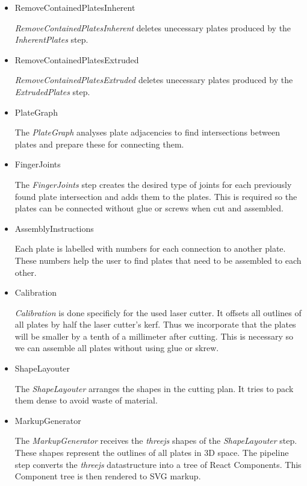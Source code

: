 \documentclass[../ClassicThesis.tex]{subfiles}
\begin{document}
\begin{itemize}
\item RemoveContainedPlatesInherent

\emph{RemoveContainedPlatesInherent} deletes unecessary plates produced by the \emph{InherentPlates} step.


\item RemoveContainedPlatesExtruded

\emph{RemoveContainedPlatesExtruded} deletes unecessary plates produced by the \emph{ExtrudedPlates} step.


\item PlateGraph

The \emph{PlateGraph} analyses plate adjacencies to find intersections between plates and prepare these for connecting them.

\item FingerJoints

The \emph{FingerJoints} step creates the desired type of joints for each previously found plate intersection and adds them to the plates. This is required so the plates can be connected without glue or screws when cut and assembled.


\item AssemblyInstructions

Each plate is labelled with numbers for each connection to another plate. These numbers help the user to find plates that need to be assembled to each other.


\item Calibration
\label{sec:calibration}

\emph{Calibration} is done specificly for the used laser cutter. It offsets all outlines of all plates by half the laser cutter’s kerf. Thus we incorporate that the plates will be smaller by a tenth of a millimeter after cutting. This is necessary so we can assemble all plates without using glue or skrew.


\item ShapeLayouter

The \emph{ShapeLayouter} arranges the shapes in the cutting plan. It tries to pack them dense to avoid waste of material.


\item MarkupGenerator

The \emph{MarkupGenerator} receives the \emph{threejs} shapes of the \emph{ShapeLayouter} step. These shapes represent the outlines of all plates in 3D space. The pipeline step converts the \emph{threejs} datastructure into a tree of React Components. This Component tree is then rendered to SVG markup.



\end{itemize}
\end{document}
